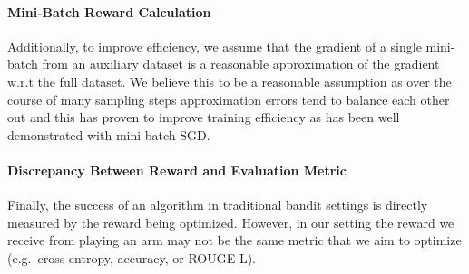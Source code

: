 \paragraph{Mini-Batch Reward Calculation}Additionally, to improve efficiency, we assume that the gradient of a single mini-batch from an auxiliary dataset is a reasonable approximation of the gradient w.r.t the full dataset. We believe this to be a reasonable assumption as over the course of many sampling steps approximation errors tend to balance each other out and this has proven to improve training efficiency as has been well demonstrated with mini-batch SGD.

\paragraph{Discrepancy Between Reward and Evaluation Metric}Finally, the success of an algorithm in traditional bandit settings is directly measured by the reward being optimized. However, in our setting the reward we receive from playing an arm may not be the same metric that we aim to optimize (e.g.\ cross-entropy, accuracy, or ROUGE-L).




